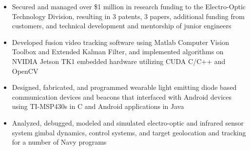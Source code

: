 \begin{itemize} [leftmargin = \itemmargin]
	\item Secured and managed over \$1 million in research funding to the Electro-Optic Technology Division, resulting in 3 patents, 3 papers, additional funding from customers, and technical development and mentorship of junior engineers
	\item Developed fusion video tracking software using Matlab Computer Vision Toolbox and Extended Kalman Filter, and implemented algorithms on NVIDIA Jetson TK1 embedded hardware utilizing CUDA C/C++ and OpenCV
	\item Designed, fabricated, and programmed wearable light emitting diode based communication devices and beacons that interfaced with Android devices using TI-MSP430s in C and Android applications in Java	
	\item Analyzed, debugged, modeled and simulated electro-optic and infrared sensor system gimbal dynamics, control systems, and target geolocation and tracking for a number of Navy programs
	
\end{itemize} 